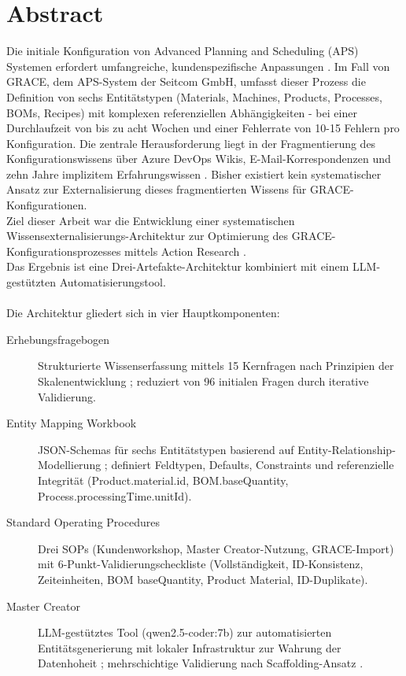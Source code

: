 \section{Abstract}
\label{sec:Abstract}

Die initiale Konfiguration von Advanced Planning and Scheduling (APS) Systemen erfordert umfangreiche, kundenspezifische Anpassungen \citep{stadtler:supply_chain_management2015, pinedo:scheduling2016}. Im Fall von GRACE, dem APS-System der Seitcom GmbH, umfasst dieser Prozess die Definition von sechs Entitätstypen (Materials, Machines, Products, Processes, BOMs, Recipes) mit komplexen referenziellen Abhängigkeiten - bei einer Durchlaufzeit von bis zu acht Wochen und einer Fehlerrate von 10-15 Fehlern pro Konfiguration. Die zentrale Herausforderung liegt in der Fragmentierung des Konfigurationswissens über Azure DevOps Wikis, E-Mail-Korrespondenzen und zehn Jahre implizitem Erfahrungswissen \citep{nonaka:knowledge_creating_company1995, polanyi:tacit_dimension1966}. Bisher existiert kein systematischer Ansatz zur Externalisierung dieses fragmentierten Wissens für GRACE-Konfigurationen. \\
Ziel dieser Arbeit war die Entwicklung einer systematischen Wissensexternalisierungs-Architektur zur Optimierung des GRACE-Konfigurationsprozesses mittels Action Research \citep{lewin:action_research1946, reason:handbook_action_research2001}. \\
Das Ergebnis ist eine Drei-Artefakte-Architektur kombiniert mit einem LLM-gestützten Automatisierungstool.
\\\\
Die Architektur gliedert sich in vier Hauptkomponenten:
\begin{description}
\item[Erhebungsfragebogen] Strukturierte Wissenserfassung mittels 15 Kernfragen nach Prinzipien der Skalenentwicklung \citep{devellis:scale_development2017, mayring:qualitative2015}; reduziert von 96 initialen Fragen durch iterative Validierung.
\item[Entity Mapping Workbook] JSON-Schemas für sechs Entitätstypen basierend auf Entity-Relationship-Modellierung \citep{chen:erm1976}; definiert Feldtypen, Defaults, Constraints und referenzielle Integrität (Product.material.id, BOM.baseQuantity, Process.processingTime.unitId).
\item[Standard Operating Procedures] Drei SOPs (Kundenworkshop, Master Creator-Nutzung, GRACE-Import) mit 6-Punkt-Validierungscheckliste (Vollständigkeit, ID-Konsistenz, Zeiteinheiten, BOM baseQuantity, Product Material, ID-Duplikate).
\item[Master Creator] LLM-gestütztes Tool (qwen2.5-coder:7b) zur automatisierten Entitätsgenerierung mit lokaler Infrastruktur zur Wahrung der Datenhoheit \citep{hummel:data_sovereignty2021, gupta:multilingual2025}; mehrschichtige Validierung nach Scaffolding-Ansatz \citep{sanwal:layered_cot2024}.
\end{description}
